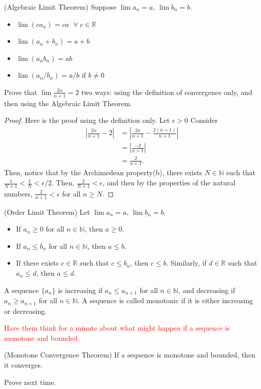 \documentclass{ximera}
\begin{document}
\begin{theorem}{(Algebraic Limit Theorem)}
Suppose $\lim a_n = a$, $\lim b_n = b$.
    \begin{itemize}
        \item $\lim(ca_n) = ca$ $\; \forall \;c \in \mathbb{R}$
        \item $\lim (a_n + b_n) = a+b$
        \item $\lim(a_nb_n) = ab$
        \item $\lim(a_n/b_n) = a/b$ if $b \neq 0$
    \end{itemize}
\end{theorem}

\begin{exercise}
    Prove that $\lim \frac{2n}{n+1} = 2$ two ways: using the definition of convergence only, and then using the Algebraic Limit Theorem. 
\end{exercise}

\begin{proof}
    Here is the proof using the definition only.  Let $\epsilon > 0$
    Consider 
    \begin{align}
        \left|\frac{2n}{n+1} -2\right| &= \left|\frac{2n}{n+1} - \frac{2(n+1)}{n+1} \right|
        \\
        &= \left|\frac{-2}{n+1}\right|
        \\
        &= \frac{2}{n+1}.
    \end{align}
    Then, notice that by the Archimedean property(b), there exists $N \in \mathbb{N}$ such that $\frac{1}{N+1} < \frac{1}N < \epsilon/2$. Then, $\frac{2}{N+1} < \epsilon$, and then by the properties of the natural numbers, $\frac{2}{n+1} < \epsilon$ for all $n \geq N$.  
\end{proof}

\newpage
\begin{theorem}{(Order Limit Theorem)}
    Let $\lim a_n = a$, $\lim b_n = b$.
    \begin{itemize}
        \item If $a_n \geq 0$ for all $n \in \mathbb{N}$, then $a \geq 0$.
        \item If $a_n \leq b_n$ for all $n \in \mathbb{N}$, then $a \leq b$.
        \item If there exists $c \in \mathbb{R}$ such that $c \leq b_n$, then $c \leq b$.  Similarly, if $d \in \mathbb{R}$ such that $a_n \leq d$, then $a \leq d$.
    \end{itemize}
\end{theorem}

\begin{definition}
    A sequence $\{a_n\}$ is increasing if $a_n \leq a_{n+1}$ for all $n \in \mathbb{N}$, and decreasing if $a_n \geq a_{n+1}$ for all $n \in \mathbb{N}$.  A sequence is called monotonic if it is either increasing or decreasing.
\end{definition}

\textcolor{red}{Have them think for a minute about what might happen if a sequence is monotone and bounded.}

\begin{theorem}{(Monotone Convergence Theorem)}
    If a sequence is monotone and bounded, then it converges.
\end{theorem}
Prove next time.
\end{document}
